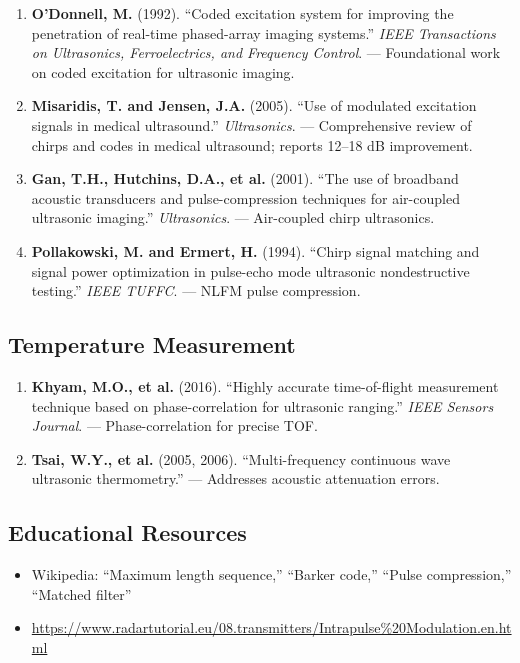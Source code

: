 \documentclass[11pt]{article}
\begin{document}
\begin{enumerate}
    \item \textbf{O'Donnell, M.} (1992). ``Coded excitation system for improving the penetration of real-time phased-array imaging systems.'' \textit{IEEE Transactions on Ultrasonics, Ferroelectrics, and Frequency Control}. --- Foundational work on coded excitation for ultrasonic imaging.

    \item \textbf{Misaridis, T. and Jensen, J.A.} (2005). ``Use of modulated excitation signals in medical ultrasound.'' \textit{Ultrasonics}. --- Comprehensive review of chirps and codes in medical ultrasound; reports 12--18 dB improvement.

    \item \textbf{Gan, T.H., Hutchins, D.A., et al.} (2001). ``The use of broadband acoustic transducers and pulse-compression techniques for air-coupled ultrasonic imaging.'' \textit{Ultrasonics}. --- Air-coupled chirp ultrasonics.

    \item \textbf{Pollakowski, M. and Ermert, H.} (1994). ``Chirp signal matching and signal power optimization in pulse-echo mode ultrasonic nondestructive testing.'' \textit{IEEE TUFFC}. --- NLFM pulse compression.
\end{enumerate}

\subsection{Temperature Measurement}

\begin{enumerate}
    \item \textbf{Khyam, M.O., et al.} (2016). ``Highly accurate time-of-flight measurement technique based on phase-correlation for ultrasonic ranging.'' \textit{IEEE Sensors Journal}. --- Phase-correlation for precise TOF.

    \item \textbf{Tsai, W.Y., et al.} (2005, 2006). ``Multi-frequency continuous wave ultrasonic thermometry.'' --- Addresses acoustic attenuation errors.
\end{enumerate}

\subsection{Educational Resources}

\begin{itemize}
    \item Wikipedia: ``Maximum length sequence,'' ``Barker code,'' ``Pulse compression,'' ``Matched filter''
    \item \url{https://www.radartutorial.eu/08.transmitters/Intrapulse\%20Modulation.en.html}
\end{itemize}
\end{document}
